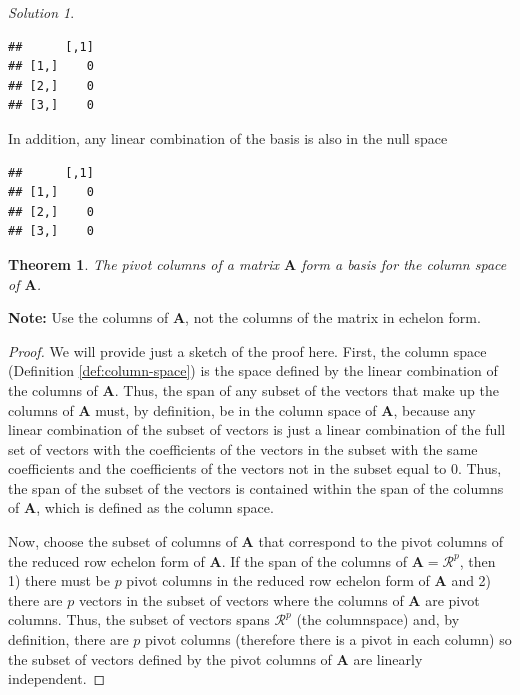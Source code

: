 \documentclass[
]{book}
\newenvironment{Shaded}{\begin{snugshade}}{\end{snugshade}}
\newcommand{\DecValTok}[1]{\textcolor[rgb]{0.00,0.00,0.81}{#1}}
\newcommand{\NormalTok}[1]{#1}
\newcommand{\OperatorTok}[1]{\textcolor[rgb]{0.81,0.36,0.00}{\textbf{#1}}}
\newcommand{\StringTok}[1]{\textcolor[rgb]{0.31,0.60,0.02}{#1}}
\newtheorem{theorem}{Theorem}[chapter]
\theoremstyle{definition}
\theoremstyle{definition}
\theoremstyle{definition}
\theoremstyle{remark}
\newtheorem*{solution}{Solution}
\begin{document}
\begin{solution}
\begin{verbatim}
##      [,1]
## [1,]    0
## [2,]    0
## [3,]    0
\end{verbatim}

In addition, any linear combination of the basis is also in the null space

\begin{Shaded}
\end{Shaded}

\begin{verbatim}
##      [,1]
## [1,]    0
## [2,]    0
## [3,]    0
\end{verbatim}

\end{solution}

\begin{theorem}
\protect\hypertarget{thm:unnamed-chunk-184}{}{\label{thm:unnamed-chunk-184} }The pivot columns of a matrix \(\mathbf{A}\) form a basis for the column space of \(\mathbf{A}\).
\end{theorem}

\textbf{Note:} Use the columns of \(\mathbf{A}\), not the columns of the matrix in echelon form.

\begin{proof}

We will provide just a sketch of the proof here. First, the column space (Definition \ref{def:column-space}) is the space defined by the linear combination of the columns of \(\mathbf{A}\). Thus, the span of any subset of the vectors that make up the columns of \(\mathbf{A}\) must, by definition, be in the column space of \(\mathbf{A}\), because any linear combination of the subset of vectors is just a linear combination of the full set of vectors with the coefficients of the vectors in the subset with the same coefficients and the coefficients of the vectors not in the subset equal to 0. Thus, the span of the subset of the vectors is contained within the span of the columns of \(\mathbf{A}\), which is defined as the column space.

Now, choose the subset of columns of \(\mathbf{A}\) that correspond to the pivot columns of the reduced row echelon form of \(\mathbf{A}\). If the span of the columns of \(\mathbf{A} = \mathcal{R}^p\), then 1) there must be \(p\) pivot columns in the reduced row echelon form of \(\mathbf{A}\) and 2) there are \(p\) vectors in the subset of vectors where the columns of \(\mathbf{A}\) are pivot columns. Thus, the subset of vectors spans \(\mathcal{R}^p\) (the columnspace) and, by definition, there are \(p\) pivot columns (therefore there is a pivot in each column) so the subset of vectors defined by the pivot columns of \(\mathbf{A}\) are linearly independent.

\end{proof}
\end{document}
